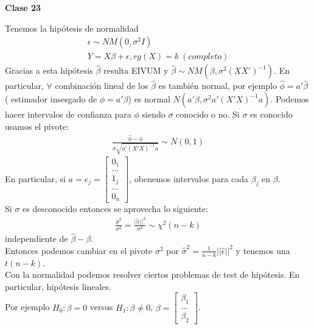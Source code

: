 \documentclass[10pt]{article}
\theoremstyle{plain}
\theoremstyle{definition}
\newcommand{\catnum}{23} %
\begin{document}
\begin{center}
\LARGE\textbf{Clase \catnum}
\end{center}
Tenemos la hipótesis de normalidad
\begin{align*}
\epsilon \sim NM(0,\sigma^2I)\\
Y = X\beta + \epsilon, rg(X) = k\ (completo)
\end{align*}
Gracias a esta hipótesis $\hat{\beta}$ resulta EIVUM y $\hat{\beta} \sim NM(\beta , \sigma^2(XX')^{-1})$. En particular, $\forall$ combinación lineal de los $\hat{\beta}$ es también normal, por ejemplo $\hat{\phi} = a'\hat{\beta}$ ( estimador insesgado de $\phi = a'\beta$) es normal $N(a'\beta , \sigma^2 a'(X'X)^{-1}a)$. Podemos hacer intervalos de confianza para $\phi$ siendo $\sigma$ conocido o no. Si $\sigma$ es conocido usamos el pivote:
\begin{align*}
\frac{\hat{\phi}-\phi}{\sigma\sqrt{a'(X'X)^{-1}a}} \sim N(0,1)
\end{align*}
En particular, si $a = e_{j} = \begin{bmatrix}
0_{1}\\ \ldots \\
1_{j} \\ \ldots \\ 0_{n}\end{bmatrix}$, obenemos intervalos para cada $\beta_{j}$ en $\beta$.\\
Si $\sigma$ es desconocido entonces se aprovecha lo siguiente:
\begin{align*}
\frac{\hat{\sigma}^2}{\sigma^2} = \frac{||\hat{\epsilon}||^2}{\sigma^2} \sim \chi^2 (n-k)
\end{align*}
independiente de $\hat{\beta}-\beta$.\\

Entonces podemos cambiar en el pivote $\sigma^2$ por $\hat{\sigma}^2 = \frac{1}{n-k}||\hat{\epsilon}||^2$ y tenemos una $t(n-k)$.\\

Con la normalidad podemos resolver ciertos problemas de test de hipótesis. En particular, hipótesis lineales.\\

Por ejemplo $H_{0}\colon \beta = 0$ versus $H_{1}\colon \beta \not = 0$, $\beta = \begin{bmatrix}
\beta_{1}\\ \ldots \\ \beta_{2}
\end{bmatrix}$.\\
\end{document}
